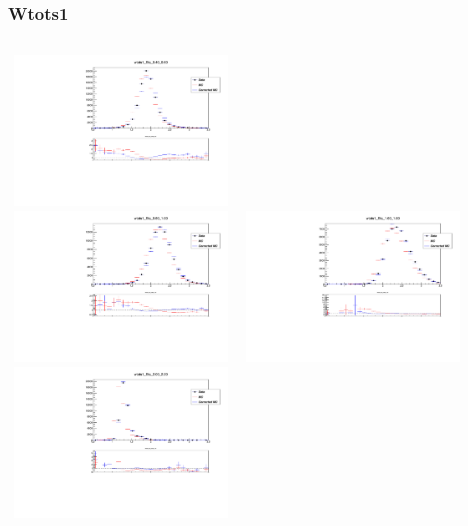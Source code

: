 \documentclass{beamer}
\begin{document}
\begin{frame}
\frametitle{Wtots1}

\begin{columns}[t]
\centering
\includegraphics[width=6cm,height=4cm]{wtots1_Eta_4_6.pdf}\\
\includegraphics[width=6cm,height=4cm]{wtots1_Eta_8_10.pdf}
\centering
\includegraphics[width=6cm,height=4cm]{wtots1_Eta_16_18.pdf}\\
\includegraphics[width=6cm,height=4cm]{wtots1_Eta_20_22.pdf}
\end{columns}
\end{frame}

\end{document}

